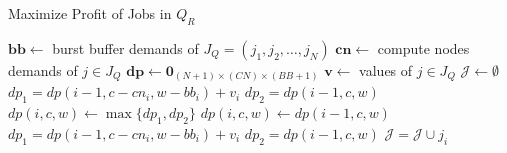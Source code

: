 \begin{algorithm}[t]
\caption{Maximize Profit of Jobs in $Q_R$}
\label{Alg:MaxCPU}
\begin{algorithmic}[1]
        \State $\boldsymbol{bb} \gets $ burst buffer demands of $J_Q = (j_1, j_2,\ldots, j_N)$
        \State $\boldsymbol{cn} \gets $ compute nodes demands of $j \in J_Q$
        \State $\boldsymbol{dp} \gets \boldsymbol{0}_{(N+1) \times (CN) \times (BB+1)}$
        \State $\boldsymbol{v} \gets$ values of $j \in J_Q$
        \State $\mathcal{J} \gets \emptyset$ 
        \\
                                                \State $dp_1 = dp(i-1, c-cn_i, w-bb_i)+v_i$
                                                \State $dp_2 = dp(i-1, c, w)$
                                                \State $dp(i, c, w) \gets \max\{dp_1, dp_2\}$
                                        \Else
                                                \State $dp(i,c,w) \gets dp(i-1,c,w)$
                                        \EndIf
                                \EndFor
                        \EndFor
                \EndFor
                \State {}
        \EndFunction
        \\
                                \State $dp_1 = dp(i-1, c-cn_i, w-bb_i)+v_i$
                                \State $dp_2 = dp(i-1, c, w)$
                                        \State $\mathcal{J} = \mathcal{J} \cup j_i$
                                        \State {}
                                \Else
                                        \State {}
                                \EndIf
                        \Else
                                \State {}
                        \EndIf
                \EndIf
        \EndFunction
\end{algorithmic}
\end{algorithm}

